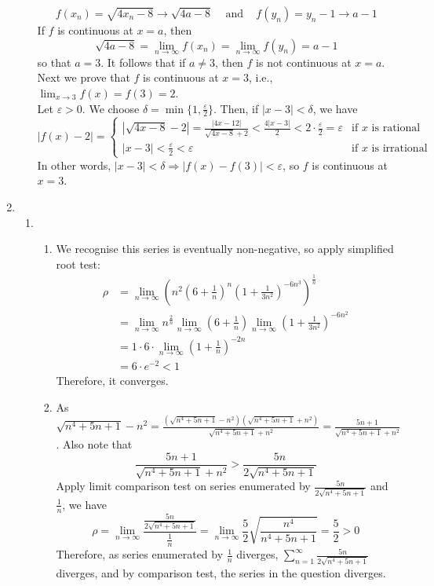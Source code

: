\documentclass[12pt]{article}
\theoremstyle{definition}
\begin{document}
\begin{enumerate}
\begin{enumerate}
    \[
f(x_n)=\sqrt{4x_n-8}\to \sqrt{4a-8}\;\;\;\text{ and }\;\;\;f(y_n)=y_n-1\to a-1
    \]
If $f$ is continuous at $x=a$, then
\[
\sqrt{4a-8}=\lim_{n\to\infty}f(x_n)=\lim_{n\to\infty}f(y_n)=a-1
\]
so that $a=3$. It follows that if $a\neq 3$, then $f$ is not continuous at $x=a$.\\Next we prove that $f$ is continuous at $x=3$, i.e., $\lim_{x\to 3} f(x)=f(3)=2$.\\
Let $\varepsilon>0$. We choose $\delta=\min\{1,\frac{\varepsilon}{2}\}$. Then, if $|x-3|<\delta$, we have
\[
|f(x)-2|=\begin{cases}
|\sqrt{4x-8}-2|=\frac{|4x-12|}{\sqrt{4x-8}+2}<\frac{4|x-3|}{2}<2\cdot\frac{\varepsilon}{2}=\varepsilon&\text{if }x\text{ is rational}\\
|x-3|<\frac{\varepsilon}{2}<\varepsilon&\text{if }x\text{ is irrational}
\end{cases}
\]
In other words, $|x-3|<\delta\Rightarrow |f(x)-f(3)|<\varepsilon$, so $f$ is continuous at $x=3$.
  \end{enumerate}
  \item\begin{enumerate}%
  \item \begin{enumerate}%
  \item We recognise this series is eventually non-negative, so apply simplified root test:
  \begin{align*}
\rho &= \lim_{n\to\infty}\left(n^2\left(6+\frac{1}{n}\right)^n\left(1+\frac{1}{3n^2}\right)^{-6n^3}\right)^{\frac{1}{n}}\\
&=\lim_{n\to\infty}n^{\frac{2}{n}}\lim_{n\to\infty}\left(6+\frac{1}{n}\right)\lim_{n\to\infty}\left(1+\frac{1}{3n^2}\right)^{-6n^2}\\
&=1\cdot 6\cdot \lim_{n\to\infty}\left(1+\frac{1}{n}\right)^{-2n}\\
&=6\cdot e^{-2}<1
  \end{align*}
  Therefore, it converges.
  \item As $\sqrt{n^4+5n+1}-n^2=\frac{(\sqrt{n^4+5n+1}-n^2)(\sqrt{n^4+5n+1}+n^2)}{\sqrt{n^4+5n+1}+n^2}=\frac{5n+1}{\sqrt{n^4+5n+1}+n^2}$. Also note that
  \[
\frac{5n+1}{\sqrt{n^4+5n+1}+n^2}>\frac{5n}{2\sqrt{n^4+5n+1}}
  \]
  Apply limit comparison test on series enumerated by $\frac{5n}{2\sqrt{n^4+5n+1}}$ and $\frac{1}{n}$, we have
  \[
\rho = \lim_{n\to\infty}\frac{\frac{5n}{2\sqrt{n^4+5n+1}}}{\frac{1}{n}}=\lim_{n\to\infty}\frac{5}{2}\sqrt{\frac{n^4}{n^4+5n+1}}=\frac{5}{2}>0
  \]
  Therefore, as series enumerated by $\frac{1}{n}$ diverges, $\sum_{n=1}^\infty\frac{5n}{2\sqrt{n^4+5n+1}}$ diverges, and by comparison test, the series in the question diverges.

\end{enumerate}
\end{enumerate}
\end{enumerate}
\end{document}
